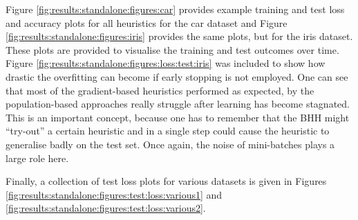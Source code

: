 Figure \ref{fig:results:standalone:figures:car} provides example training and test loss and accuracy plots for all heuristics for the car dataset and Figure \ref{fig:results:standalone:figures:iris} provides the same plots, but for the iris dataset. These plots are provided to visualise the training and test outcomes over time. Figure \ref{fig:results:standalone:figures:loss:test:iris} was included to show how drastic the overfitting can become if early stopping is not employed. One can see that most of the gradient-based heuristics performed as expected, by the population-based approaches really struggle after learning has become stagnated. This is an important concept, because one has to remember that the \Ac{BHH} might ``try-out'' a certain heuristic and in a single step could cause the heuristic to generalise badly on the test set. Once again, the noise of mini-batches plays a large role here.






Finally, a collection of test loss plots for various datasets is given in Figures \ref{fig:results:standalone:figures:test:loss:various1} and \ref{fig:results:standalone:figures:test:loss:various2}.

